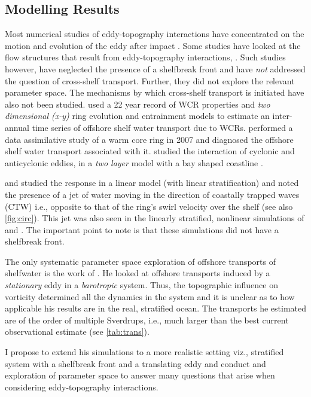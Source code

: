 \subsection{Modelling Results}

Most numerical studies of eddy-topography interactions have concentrated on the motion and evolution of the eddy after impact \citep[e.g.\ ][]{Itoh2001,Smith1983,Hyun2008}. Some studies have looked at the flow structures that result from eddy-topography interactions, \citep[e.g.\ ][]{Frolov2004,Wei2009,Oey2004}. Such studies however, have neglected the presence of a shelfbreak front and have \emph{not} addressed the question of cross-shelf transport. Further, they did not explore the relevant parameter space. The mechanisms by which cross-shelf transport is initiated have also not been studied. \cite{Chaudhuri2009} used a 22 year record of WCR properties and \emph{two dimensional (x-y)} ring evolution and entrainment models to estimate an inter-annual time series of offshore shelf water transport due to WCRs. \cite{Chen2011} performed a data assimilative study of a warm core ring in 2007 and diagnosed the offshore shelf water transport associated with it. \cite{Zhang2009} studied the interaction of cyclonic and anticyclonic eddies, in a \emph{two layer} model with a bay shaped coastline .

  \cite{Chapman1987} and \cite{Kelly1988} studied the response in a linear model (with linear stratification) and noted the presence of a jet of water moving in the direction of coastally trapped waves (CTW) i.e., opposite to that of the ring’s swirl velocity over the shelf (see also \cref{fig:circ}). This jet was also seen in the linearly stratified, nonlinear simulations of \cite{Oey2004} and \cite{Wei2009}. The important point to note is that these simulations did not have a shelfbreak front.
 
 The only systematic parameter space exploration of offshore transports of shelfwater is the work of \cite{Wang1992}. He looked at offshore transports induced by a \emph{stationary} eddy in a \emph{barotropic} system. Thus, the topographic influence on vorticity determined all the dynamics in the system and it is unclear as to how applicable his results are in the real, stratified ocean. The transports he estimated are of the order of multiple Sverdrups, i.e., much larger than the best current observational estimate (see \cref{tab:trans}). 
 
I propose to extend his simulations to a more realistic setting viz., stratified system with a shelfbreak front and a translating eddy and conduct and exploration of parameter space to answer many questions that arise when considering eddy-topography interactions. 

